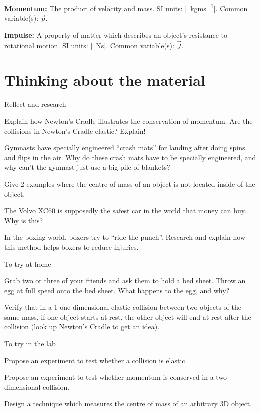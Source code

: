 \begin{definitions}
	
	\textbf{Momentum:} The product of velocity and mass. SI units: [\SI{}{kgms^{-1}}]. Common variable(s): $\vec p$.
	\medskip
	
	\item \textbf{Impulse:} A property of matter which describes an object's resistance to rotational motion. SI units: [\SI{}{Ns}]. Common variable(s): $\vec J$.
	\medskip
	
\end{definitions}

\newpage
\section{Thinking about the material}

\begin{chapteractivity}{Reflect and research}
{
\item Explain how Newton's Cradle illustrates the conservation of momentum. Are the collisions in Newton's Cradle elastic? Explain! 
\item Gymnasts have specially engineered ``crash mats'' for landing after doing spins and flips in the air. Why do these crash mats have to be specially engineered, and why can't the gymnast just use a big pile of blankets?
\item Give 2 examples where the centre of mass of an object is not located inside of the object.
\item The Volvo XC60 is supposedly the safest car in the world that money can buy. Why is this?
\item In the boxing world, boxers try to ``ride the punch''. Research and explain how this method helps boxers to reduce injuries.
}
\end{chapteractivity}

\begin{chapteractivity}{To try at home}
{
\item Grab two or three of your friends and ask them to hold a bed sheet. Throw an egg at full speed onto the bed sheet. What happens to the egg, and why? 
\item Verify that in a 1 one-dimensional elastic collision between two objects of the same mass, if one object starts at rest, the other object will end at rest after the collision (look up Newton's Cradle to get an idea).
}
\end{chapteractivity}

\begin{chapteractivity}{To try in the lab}
{
\item Propose an experiment to test whether a collision is elastic.
\item Propose an experiment to test whether momentum is conserved in a two-dimensional collision.
\item Design a technique which measures the centre of mass of an arbitrary 3D object.
}
\end{chapteractivity}

